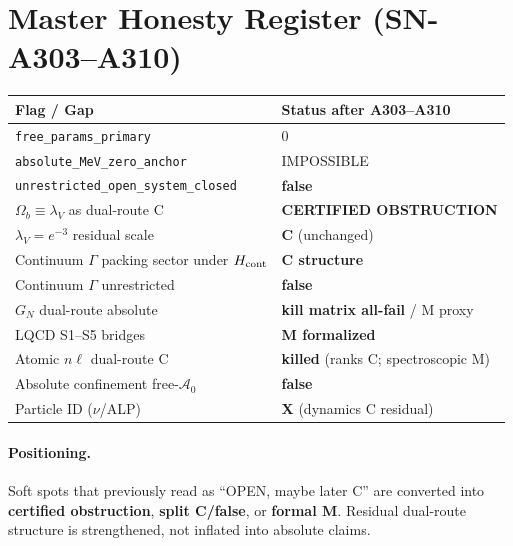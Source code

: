
\section*{Master Honesty Register (SN-A303--A310)}
\label{sec:honesty-A303-A310}
\begin{center}
\begin{tabular}{@{}p{7.8cm}p{4.8cm}@{}}
\toprule
\textbf{Flag / Gap} & \textbf{Status after A303--A310} \\
\midrule
\texttt{free\_params\_primary} & $0$ \\
\texttt{absolute\_MeV\_zero\_anchor} & IMPOSSIBLE \\
\texttt{unrestricted\_open\_system\_closed} & \textbf{false} \\
$\Omega_b\equiv\lambda_V$ as dual-route C & \textbf{CERTIFIED OBSTRUCTION} \\
$\lambda_V=e^{-3}$ residual scale & \textbf{C} (unchanged) \\
Continuum $\Gamma$ packing sector under $H_{\rm cont}$ & \textbf{C structure} \\
Continuum $\Gamma$ unrestricted & \textbf{false} \\
$G_N$ dual-route absolute & \textbf{kill matrix all-fail} / M proxy \\
LQCD S1--S5 bridges & \textbf{M formalized} \\
Atomic $n\ell$ dual-route C & \textbf{killed} (ranks C; spectroscopic M) \\
Absolute confinement free-$\mathcal{A}_0$ & \textbf{false} \\
Particle ID ($\nu$/ALP) & \textbf{X} (dynamics C residual) \\
\bottomrule
\end{tabular}
\end{center}

\paragraph{Positioning.}
Soft spots that previously read as ``OPEN, maybe later C'' are converted into
\textbf{certified obstruction}, \textbf{split C/false}, or \textbf{formal M}.
Residual dual-route structure is strengthened, not inflated into absolute claims.

